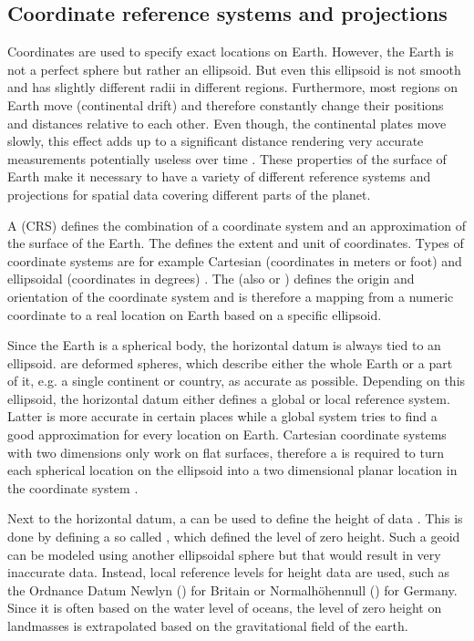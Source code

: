 	\subsection{Coordinate reference systems and projections}
	
		Coordinates are used to specify exact locations on Earth.
		However, the Earth is not a perfect sphere but rather an ellipsoid.
		But even this ellipsoid is not smooth and has slightly different radii in different regions.
		Furthermore, most regions on Earth move (continental drift) and therefore constantly change their positions and distances relative to each other.
		Even though, the continental plates move slowly, this effect adds up to a significant distance rendering very accurate measurements potentially useless over time \cite[7]{ordenance-survey-booklet}.
		These properties of the surface of Earth make it necessary to have a variety of different reference systems and projections for spatial data covering different parts of the planet.
		
		A  (CRS) defines the combination of a coordinate system and an approximation of the surface of the Earth.
		The  defines the extent and unit of coordinates.
		Types of coordinate systems are for example Cartesian (coordinates in meters or foot) and ellipsoidal (coordinates in degrees) \cite[11-13]{ordenance-survey-booklet}.
		The  (also  or ) defines the origin and orientation of the coordinate system and is therefore a mapping from a numeric coordinate to a real location on Earth based on a specific ellipsoid.
		
		Since the Earth is a spherical body, the horizontal datum is always tied to an ellipsoid.
		 are deformed spheres, which describe either the whole Earth or a part of it, e.g. a single continent or country, as accurate as possible.
		Depending on this ellipsoid, the horizontal datum either defines a global or local reference system.
		Latter is more accurate in certain places while a global system tries to find a good approximation for every location on Earth.
		Cartesian coordinate systems with two dimensions only work on flat surfaces, therefore a  is required to turn each spherical location on the ellipsoid into a two dimensional planar location in the coordinate system \cite[17]{ordenance-survey-booklet}.
		
		Next to the horizontal datum, a  can be used to define the height of data \cite{ordenance-survey-booklet}.
		This is done by defining a so called , which defined the level of zero height.
		Such a geoid can be modeled using another ellipsoidal sphere but that would result in very inaccurate data.
		Instead, local reference levels for height data are used, such as the Ordnance Datum Newlyn () for Britain or Normalhöhennull () for Germany.
		Since it is often based on the water level of oceans, the level of zero height on landmasses is extrapolated based on the gravitational field of the earth.
		
